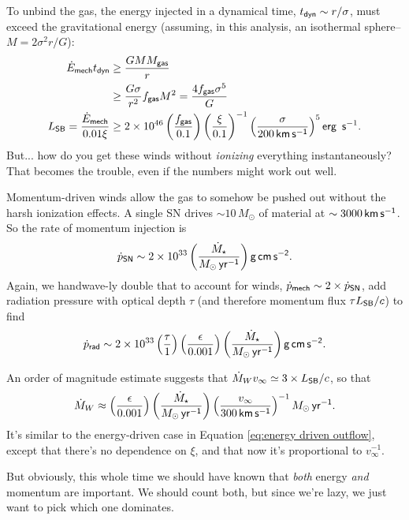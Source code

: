 \documentclass{tufte-handout}
\renewcommand{\rm}{\sf}
\renewcommand{\textrm}{\textsf}
\newcommand{\e}[1]{\times 10^{#1}}
\begin{document}
To unbind the gas, the energy injected in a dynamical time, $t_{\rm dyn} \sim r/ \sigma$, must exceed the gravitational energy (assuming, in this analysis, an isothermal sphere--$M = 2\sigma^2 r/G$):
\begin{align}
\dot E_{\rm mech}t_{\rm dyn} &\geq \frac{GMM_{\rm gas}}{r} \nonumber \\
&\geq \frac{G\sigma}{r^2}f_{\rm gas} M^2 = \frac{4f_{\rm gas}\sigma^5}{G}\nonumber \\
L_{\rm SB} = \frac{\dot E_{\rm mech}}{0.01 \xi} &\geq 2\e{46}\left (\frac{f_{\rm gas}}{0.1}\right )\left (\frac{\xi}{0.1}\right )^{-1}\left (\frac{\sigma}{200\, \rm km\, s^{-1}}\right )^{5} \textrm{erg\, s}^{-1}.
\end{align}
But... how do you get these winds without \textit{ionizing} everything instantaneously? That becomes the trouble, even if the numbers might work out well. 

Momentum-driven winds allow the gas to somehow be pushed out without the harsh ionization effects. A single SN drives $\sim 10 \, M_\odot$ of material at $\sim 3000\,\rm km\, s^{-1}$. So the rate of momentum injection is 
\[\dot p_{\rm SN} \sim 2\e{33} \left (\frac{\dot M_\star}{M_\odot \rm\, yr^{-1}}\right ) \rm g\, cm\, s^{-2}. \]
Again, we handwave-ly double that to account for winds, $\dot p_{\rm mech} \sim 2 \times \dot p_{\rm SN}$, add radiation pressure with optical depth $\tau$ (and therefore momentum flux $\tau L_{\rm SB}/c$) to find
\begin{equation}
\dot p_{\rm rad} \sim 2\e{33} \left (\frac{\tau}{1}\right ) \left (\frac{\epsilon}{0.001}\right )\left (\frac{\dot M_\star}{M_\odot \,\rm yr^{-1}}\right ) \rm g\, cm\, s^{-2}.
\end{equation}

An order of magnitude estimate suggests that $\dot M_W v_{\infty} \simeq 3\times L_{\rm SB}/c$, so that
\begin{equation}
\dot M_W \approx \left (\frac{\epsilon}{0.001}\right )\left (\frac{\dot M_\star}{M_\odot \, \rm yr^{-1}}\right )\left (\frac{v_\infty}{300\, \rm km \, s^{-1}}\right )^{-1} M_\odot \rm\, yr^{-1}.
\end{equation}
It's similar to the energy-driven case in Equation \eqref{eq:energy driven outflow}, except that there's no dependence on $\xi$, and that now it's proportional to $v_{\infty}^{-1}$.

But obviously, this whole time we should have known that \textit{both} energy \textit{and} momentum are important. We should count both, but since we're lazy, we just want to pick which one dominates.
\end{document}
